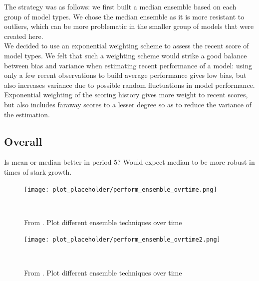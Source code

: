 The strategy was as follows: we first built a median ensemble based on each group of model types. We chose the median ensemble as it is more resistant to outliers, which can be more problematic in the smaller group of models that were created here.\\
We decided to use an exponential weighting scheme to assess the recent score of model types. We felt that such a weighting scheme would strike a good balance between bias and variance when estimating recent performance of a model: using only a few recent observations to build average performance gives low bias, but also increases variance due to possible random fluctuations in model performance. Exponential weighting of the scoring history gives more weight to recent scores, but also includes faraway scores to a lesser degree so as to reduce the variance of the estimation.\\
\subsection{Overall}
Is mean or median better in period 5? Would expect median to be more robust in times of stark growth.
\begin{figure}
\centering
\texttt{[image: plot\_placeholder/perform\_ensemble\_ovrtime.png]}
\caption{From \cite{ray_ensemble_2020}. Plot different ensemble techniques over time}
\
\end{figure}
\begin{figure}
\centering
\texttt{[image: plot\_placeholder/perform\_ensemble\_ovrtime2.png]}
\caption{From \cite{ray_ensemble_2020}. Plot different ensemble techniques over time}
\
\end{figure}


